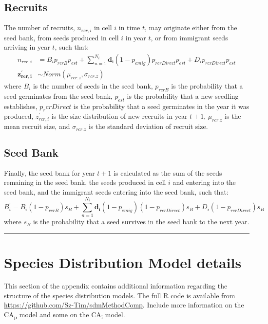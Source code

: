 \documentclass[]{article}
\begin{document}
\subsection{Recruits}

The number of recruits, \(n_{rcr,i}\) in cell \(i\) in time \(t\), may
originate either from the seed bank, from seeds produced in cell \(i\)
in year \(t\), or from immigrant seeds arriving in year \(t\), such
that: \begin{align}
n_{rcr,i} &= B_i p_{rcrB}p_{est} + \sum\limits_{n=1}^{N_i} \boldsymbol{d_i}(1-p_{emig})p_{rcrDirect}p_{est} + D_i p_{rcrDirect}p_{est}\\
\boldsymbol{z^{\prime}_{rcr,i}} &\sim Norm(\mu_{rcr.z}, \sigma_{rcr.z})
\end{align} where \(B_i\) is the number of seeds in the seed bank,
\(p_{rcrB}\) is the probability that a seed germinates from the seed
bank, \(p_{est}\) is the probability that a new seedling establishes,
\(p_rcrDirect\) is the probability that a seed germinates in the year it
was produced, \(z^{\prime}_{rcr,i}\) is the size distribution of new
recruits in year \(t+1\), \(\mu_{rcr.z}\) is the mean recruit size, and
\(\sigma_{rcr.z}\) is the standard deviation of recruit size.

\subsection{Seed Bank}

Finally, the seed bank for year \(t+1\) is calculated as the sum of the
seeds remaining in the seed bank, the seeds produced in cell \(i\) and
entering into the seed bank, and the immigrant seeds entering into the
seed bank, such that: \begin{equation}
B^{\prime}_i = B_i(1-p_{rcrB})s_B + \sum\limits_{n=1}^{N_i} \boldsymbol{d_i}(1-p_{emig})(1-p_{rcrDirect})s_B + D_i(1-p_{rcrDirect})s_B
\end{equation} where \(s_B\) is the probability that a seed survives in
the seed bank to the next year.

\begin{center}\rule{0.5\linewidth}{\linethickness}\end{center}

\newpage
\section{Species Distribution Model details}

This section of the appendix contains additional information regarding
the structure of the species distribution models. The full R code is
available from \url{https://github.com/Sz-Tim/sdmMethodComp}. Include
more information on the CA\textsubscript{p} model and some on the
CA\textsubscript{i} model.
\end{document}
